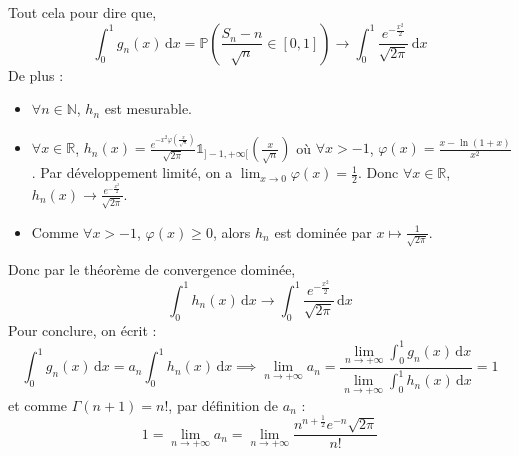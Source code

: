 \begin{demonstration}
		Tout cela pour dire que,
		\[ \int_0^1 g_n(x) \, \mathrm{d}x = \mathbb{P} \left( \frac{S_n - n}{\sqrt{n}} \in [0,1] \right) \longrightarrow \int_0^1 \frac{e^{-\frac{x^2}{2}}}{\sqrt{2 \pi}} \, \mathrm{d}x \]
		De plus :
		\begin{itemize}
			\item $\forall n \in \mathbb{N}$, $h_n$ est mesurable.
			\item $\forall x \in \mathbb{R}$, $h_n(x) = \frac{e^{-x^2 \varphi \left( \frac{x}{\sqrt{n}} \right)}}{\sqrt{2 \pi}} \mathbb{1}_{]-1, +\infty[} \left( \frac{x}{\sqrt{n}} \right)$ où $\forall x > -1$, $\varphi(x) = \frac{x - \ln(1+x)}{x^2}$. Par développement limité, on a $\lim_{x \rightarrow 0} \varphi(x) = \frac{1}{2}$. Donc $\forall x \in \mathbb{R}$, $h_n(x) \longrightarrow \frac{e^{-\frac{x^2}{2}}}{\sqrt{2 \pi}}$.
			\item Comme $\forall x > -1$, $\varphi(x) \geq 0$, alors $h_n$ est dominée par $x \mapsto \frac{1}{\sqrt{2 \pi}}$.
		\end{itemize}
		\medskip
		Donc par le théorème de convergence dominée,
		\[ \int_0^1 h_n(x) \, \mathrm{d}x \longrightarrow \int_0^1 \frac{e^{-\frac{x^2}{2}}}{\sqrt{2 \pi}} \, \mathrm{d}x \]
		Pour conclure, on écrit :
		\[ \int_0^1 g_n(x) \, \mathrm{d}x = a_n \int_0^1 h_n(x) \, \mathrm{d}x \implies \lim_{n \rightarrow +\infty} a_n = \frac{\lim_{n \rightarrow +\infty} \int_0^1 g_n(x) \, \mathrm{d}x}{\lim_{n \rightarrow +\infty} \int_0^1 h_n(x) \, \mathrm{d}x} = 1 \]
		et comme $\Gamma(n+1) = n!$, par définition de $a_n$ :
		\[ 1 = \lim_{n \rightarrow +\infty} a_n = \lim_{n \rightarrow +\infty} \frac{n^{n + \frac{1}{2}} e^{-n} \sqrt{2\pi}}{n!} \]
	\end{demonstration}

